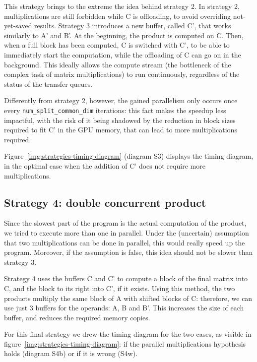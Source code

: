 This strategy brings to the extreme the idea behind strategy 2.
In strategy 2, multiplications are still forbidden while C is offloading, to avoid overriding not-yet-saved results.
Strategy 3 introduces a new buffer, called C', that works similarly to A' and B'.
At the beginning, the product is computed on C.
Then, when a full block has been computed, C is switched with C', to be able to immediately start the computation, while the offloading of C can go on in the background.
This ideally allows the compute stream (the bottleneck of the complex task of matrix multiplications) to run continuously, regardless of the status of the transfer queues.

Differently from strategy 2, however, the gained parallelism only occurs once every \texttt{num\_split\_common\_dim} iterations: this fact makes the speedup less impactful, with the risk of it being shadowed by the reduction in block sizes required to fit C' in the GPU memory, that can lead to more multiplications required.

Figure~\ref{img:strategies-timing-diagram} (diagram S3) displays the timing diagram, in the optimal case when the addition of C' does not require more multiplications.


\subsection{Strategy 4: double concurrent product}

Since the slowest part of the program is the actual computation of the product, we tried to execute more than one in parallel.
Under the (uncertain) assumption that two multiplications can be done in parallel, this would really speed up the program.
Moreover, if the assumption is false, this idea should not be slower than strategy 3.

Strategy 4 uses the buffers C and C' to compute a block of the final matrix into C, and the block to its right into C', if it exists.
Using this method, the two products multiply the same block of A with shifted blocks of C: therefore, we can use just 3 buffers for the operands: A, B and B'.
This increases the size of each buffer, and reduces the required memory copies.

For this final strategy we drew the timing diagram for the two cases, as visible in figure~\ref{img:strategies-timing-diagram}: if the parallel multiplications hypothesis holds (diagram S4b) or if it is wrong (S4w).

